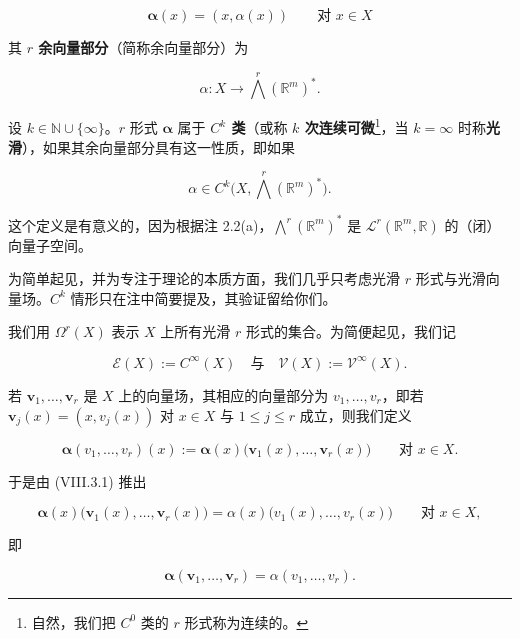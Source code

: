 \[
\boldsymbol{\alpha}(x) = (x, \alpha(x)) \qquad \text{对 } x \in X
\]

其 \textbf{$ r $ 余向量部分}（简称余向量部分）为

\[
\alpha: X \to \bigwedge^{r}(\mathbb{R}^{m})^{*}.
\]

设 $ k \in \mathbb{N} \cup \{\infty\} $。$ r $ 形式 $ \boldsymbol{\alpha} $ 属于 \textbf{$ C^{k} $ 类}（或称 \textbf{$ k $ 次连续可微}\footnote{自然，我们把 $ C^{0} $ 类的 $ r $ 形式称为连续的。}，当 $ k = \infty $ 时称\textbf{光滑}），如果其余向量部分具有这一性质，即如果

\begin{equation}
\alpha \in C^{k}\big(X, \bigwedge^{r}(\mathbb{R}^{m})^{*}\big).\tag{3.2}
\end{equation}

这个定义是有意义的，因为根据注 2.2(a)，$ \bigwedge^{r}(\mathbb{R}^{m})^{*} $ 是 $ \mathcal{L}^{r}(\mathbb{R}^{m},\mathbb{R}) $ 的（闭）向量子空间。

为简单起见，并为专注于理论的本质方面，我们几乎只考虑光滑 $ r $ 形式与光滑向量场。$ C^{k} $ 情形只在注中简要提及，其验证留给你们。

我们用 $ \Omega^{r}(X) $ 表示 $ X $ 上所有光滑 $ r $ 形式的集合。为简便起见，我们记

\[
\mathcal{E}(X) := C^{\infty}(X) \quad \text{与} \quad \mathcal{V}(X) := \mathcal{V}^{\infty}(X).
\]

若 $ \boldsymbol{v}_{1},\ldots,\boldsymbol{v}_{r} $ 是 $ X $ 上的向量场，其相应的向量部分为 $ v_{1},\ldots,v_{r} $，即若 $ \boldsymbol{v}_{j}(x) = (x,v_{j}(x)) $ 对 $ x \in X $ 与 $ 1 \le j \le r $ 成立，则我们定义

\begin{equation}
\boldsymbol{\alpha}(v_{1},\ldots,v_{r})(x) := \boldsymbol{\alpha}(x)\big(\boldsymbol{v}_{1}(x),\ldots,\boldsymbol{v}_{r}(x)\big) \qquad \text{对 } x \in X.\tag{3.3}
\end{equation}

于是由 (VIII.3.1) 推出

\[
\boldsymbol{\alpha}(x)\big(\boldsymbol{v}_{1}(x),\ldots,\boldsymbol{v}_{r}(x)\big) = \alpha(x)\big(v_{1}(x),\ldots,v_{r}(x)\big) \qquad \text{对 } x \in X,
\]

即

\begin{equation}
\boldsymbol{\alpha}(\boldsymbol{v}_{1},\ldots,\boldsymbol{v}_{r}) = \alpha(v_{1},\ldots,v_{r}).\tag{3.4}
\end{equation}

